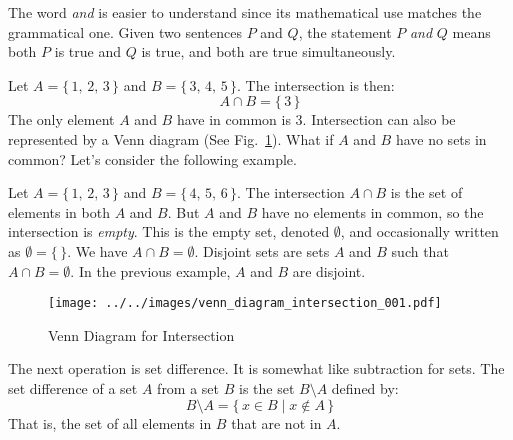 \documentclass{article}
\theoremstyle{plain}
\theoremstyle{normal}
\newenvironment{example}{%
    \pushQED{\qed}\renewcommand{\qedsymbol}{$\blacksquare$}\examplex%
}{%
    \popQED\endexamplex%
}
\newenvironment{definition}{%
    \pushQED{\qed}\renewcommand{\qedsymbol}{$\blacksquare$}\definitionx%
}{%
    \popQED\enddefinitionx%
}
\begin{document}
        The word \textit{and} is easier to understand since its mathematical
        use matches the grammatical one. Given two sentences $P$ and $Q$,
        the statement $P$ \textit{and} $Q$ means both $P$ is true and $Q$ is
        true, and both are true simultaneously.
        \begin{example}
            Let $A=\{\,1,\,2,\,3\,\}$ and $B=\{\,3,\,4,\,5\,\}$. The
            intersection is then:
            \begin{equation}
                A\cap{B}=\{\,3\,\}
            \end{equation}
            The only element $A$ and $B$ have in common is 3.
        \end{example}
        Intersection can also be represented by a Venn diagram
        (See Fig.~\ref{fig:venn_diagram_intersection_001}). What if $A$ and $B$
        have no sets in common? Let's consider the following example.
        \begin{example}
            Let $A=\{\,1,\,2,\,3\,\}$ and $B=\{\,4,\,5,\,6\,\}$. The
            intersection $A\cap{B}$ is the set of elements in both $A$ and $B$.
            But $A$ and $B$ have no elements in common, so the intersection
            is \textit{empty}. This is the empty set, denoted $\emptyset$, and
            occasionally written as $\emptyset=\{\,\}$. We have
            $A\cap{B}=\emptyset$.
        \end{example}
        Disjoint sets are sets $A$ and $B$ such that $A\cap{B}=\emptyset$.
        In the previous example, $A$ and $B$ are disjoint.
        \par\hfill\par
        \begin{figure}
            \centering
            \texttt{[image: ../../images/venn\_diagram\_intersection\_001.pdf]}
            \caption{Venn Diagram for Intersection}
            \label{fig:venn_diagram_intersection_001}
        \end{figure}
        The next operation is set difference. It is somewhat like subtraction
        for sets.
        \begin{definition}[\textbf{Set Difference}]
            The set difference of a set $A$ from a set $B$ is the set
            $B\setminus{A}$ defined by:
            \begin{equation}
                B\setminus{A}=\{\,x\in{B}\;|\;x\notin{A}\,\}
            \end{equation}
            That is, the set of all elements in $B$ that are not in $A$.
        \end{definition}
\end{document}
